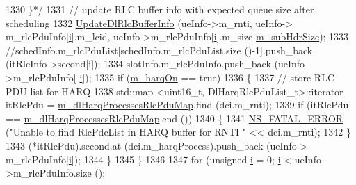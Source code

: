 \begin{DoxyCode}
1330 \textcolor{comment}{                                                                \}*/}
1331                                 \textcolor{comment}{// update RLC buffer info with expected queue size after scheduling}
1332                                 \hyperlink{classns3_1_1MmWaveFlexTtiMaxRateMacScheduler_a446184ab542a4ed8d3c7725db38829bd}{UpdateDlRlcBufferInfo} (ueInfo->m\_rnti, ueInfo->
      m\_rlcPduInfo[\hyperlink{bernuolliDistribution_8m_a6f6ccfcf58b31cb6412107d9d5281426}{i}].m\_lcid, ueInfo->m\_rlcPduInfo[\hyperlink{bernuolliDistribution_8m_a6f6ccfcf58b31cb6412107d9d5281426}{i}].m\_size-\hyperlink{classns3_1_1MmWaveFlexTtiMaxRateMacScheduler_a0f2c8958e58101914ae43e9453f306c8}{m\_subHdrSize});
1333                                 \textcolor{comment}{//schedInfo.m\_rlcPduList[schedInfo.m\_rlcPduList.size ()-1].push\_back
       (itRlcInfo->second[i]);}
1334                                 slotInfo.m\_rlcPduInfo.push\_back (ueInfo->m\_rlcPduInfo[
      \hyperlink{bernuolliDistribution_8m_a6f6ccfcf58b31cb6412107d9d5281426}{i}]);
1335                                 \textcolor{keywordflow}{if} (\hyperlink{classns3_1_1MmWaveFlexTtiMaxRateMacScheduler_a43dee0cca8dce652c2a2dc750262708e}{m\_harqOn} == \textcolor{keyword}{true})
1336                                 \{
1337                                         \textcolor{comment}{// store RLC PDU list for HARQ}
1338                                         std::map <uint16\_t, DlHarqRlcPduList\_t>::iterator itRlcPdu =  
      \hyperlink{classns3_1_1MmWaveFlexTtiMaxRateMacScheduler_a5eeb7aeecc26d9849aadd3da24e00f68}{m\_dlHarqProcessesRlcPduMap}.find (dci.m\_rnti);
1339                                         \textcolor{keywordflow}{if} (itRlcPdu == 
      \hyperlink{classns3_1_1MmWaveFlexTtiMaxRateMacScheduler_a5eeb7aeecc26d9849aadd3da24e00f68}{m\_dlHarqProcessesRlcPduMap}.end ())
1340                                         \{
1341                                                 \hyperlink{group__fatal_ga5131d5e3f75d7d4cbfd706ac456fdc85}{NS\_FATAL\_ERROR} (\textcolor{stringliteral}{"Unable to find RlcPdcList in
       HARQ buffer for RNTI "} << dci.m\_rnti);
1342                                         \}
1343                                         (*itRlcPdu).second.at (dci.m\_harqProcess).push\_back (ueInfo->
      m\_rlcPduInfo[\hyperlink{bernuolliDistribution_8m_a6f6ccfcf58b31cb6412107d9d5281426}{i}]);
1344                                 \}
1345                         \}
1346 
1347                         \textcolor{keywordflow}{for} (\textcolor{keywordtype}{unsigned} \hyperlink{bernuolliDistribution_8m_a6f6ccfcf58b31cb6412107d9d5281426}{i} = 0; \hyperlink{bernuolliDistribution_8m_a6f6ccfcf58b31cb6412107d9d5281426}{i} < ueInfo->m\_rlcPduInfo.size (); 

\end{DoxyCode}
